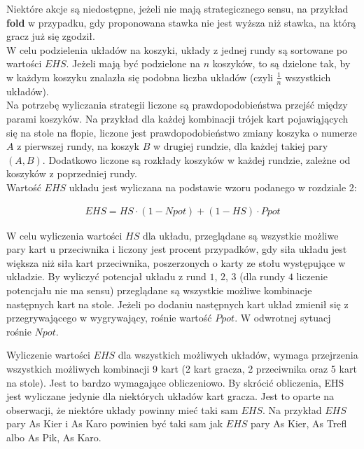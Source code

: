 \documentclass[licencjacka]{pracamgr}
\begin{document}
\noindent
Niektóre akcje są niedostępne, jeżeli nie mają strategicznego sensu, na przykład \textbf{fold} w przypadku, gdy
proponowana stawka nie jest wyższa niż stawka, na którą gracz już się zgodził. \\

\noindent
W celu podzielenia układów na koszyki, układy z jednej rundy są sortowane po wartości $EHS$. Jeżeli mają być podzielone na
$n$ koszyków, to są dzielone tak, by w każdym koszyku znalazła się podobna liczba układów (czyli $\frac{1}{n}$ wszystkich układów). \\

\noindent
Na potrzebę wyliczania strategii liczone są prawdopodobieństwa przejść między parami koszyków. Na przykład dla każdej kombinacji
trójek kart pojawiąjących się na stole na flopie, liczone jest prawdopodobieństwo zmiany koszyka o numerze $A$ z pierwszej
rundy, na koszyk $B$ w drugiej rundzie, dla każdej takiej pary $(A, B)$. Dodatkowo liczone są rozkłady koszyków
w każdej rundzie, zależne od koszyków z poprzedniej rundy. \\

\noindent
Wartość $EHS$ układu jest wyliczana na podstawie wzoru podanego w rozdziale 2:

\begin{align*}
EHS = HS \cdot (1 - Npot) + (1 - HS) \cdot Ppot
\end{align*}

\noindent
W celu wyliczenia wartości $HS$ dla układu, przeglądane są wszystkie możliwe pary kart u przeciwnika i liczony jest procent
przypadków, gdy siła układu jest większa niż siła kart przeciwnika, poszerzonych o karty ze stołu występujące w układzie.
By wyliczyć potencjał układu z rund $1$, $2$, $3$ (dla rundy $4$ liczenie potencjału nie ma sensu) przeglądane są wszystkie
możliwe kombinacje następnych kart na stole. Jeżeli po dodaniu następnych kart układ zmienił się z przegrywającego w
wygrywający, rośnie wartość $Ppot$. W odwrotnej sytuacj rośnie $Npot$.

\noindent
Wyliczenie wartości $EHS$ dla wszystkich możliwych układów, wymaga przejrzenia wszystkich możliwych kombinacji 9 kart (2 kart gracza, 2 przeciwnika
oraz 5 kart na stole). Jest to bardzo wymagające obliczeniowo. By skrócić obliczenia, EHS jest wyliczane jedynie dla niektórych układów
kart gracza. Jest to oparte na obserwacji, że niektóre układy powinny mieć taki sam $EHS$. Na przykład $EHS$ pary As Kier i As Karo powinien być taki
sam jak $EHS$ pary As Kier, As Trefl albo As Pik, As Karo. 
\end{document}
